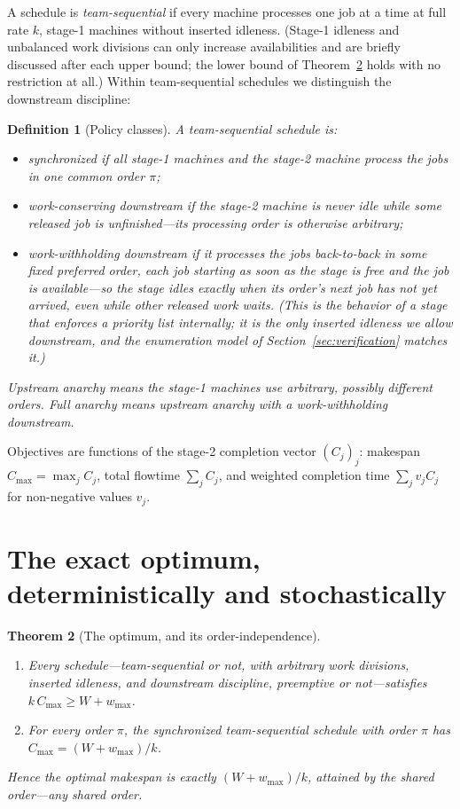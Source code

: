 \documentclass[sn-mathphys,NameDate]{sn-jnl}
\theoremstyle{thmstyleone}
\newtheorem{theorem}{Theorem}
\theoremstyle{thmstylethree}
\newtheorem{definition}[theorem]{Definition}
\theoremstyle{thmstyletwo}
\begin{document}
A schedule is \emph{team-sequential} if every machine processes one
job at a time at full rate $k$, stage-1 machines without inserted
idleness. (Stage-1 idleness and unbalanced work divisions can only
increase availabilities and are briefly discussed after each upper
bound; the lower bound of Theorem~\ref{thm:optimum} holds with no
restriction at all.) Within team-sequential schedules we distinguish
the downstream discipline:

\begin{definition}[Policy classes]\label{def:classes}
A team-sequential schedule is:
\begin{itemize}
\item \emph{synchronized} if all stage-1 machines and the stage-2
machine process the jobs in one common order $\pi$;
\item \emph{work-conserving downstream} if the stage-2 machine is
never idle while some released job is unfinished---its processing
order is otherwise arbitrary;
\item \emph{work-withholding downstream} if it processes the jobs
back-to-back in some fixed preferred order, each job starting as
soon as the stage is free \emph{and} the job is available---so the
stage idles exactly when its order's next job has not yet arrived,
even while other released work waits. (This is the behavior of a
stage that enforces a priority list internally; it is the only
inserted idleness we allow downstream, and the enumeration model of
Section~\ref{sec:verification} matches it.)
\end{itemize}
\emph{Upstream anarchy} means the stage-1 machines use arbitrary,
possibly different orders. \emph{Full anarchy} means upstream
anarchy with a work-withholding downstream.
\end{definition}

Objectives are functions of the stage-2 completion vector
$(C_j)_{j}$: makespan $C_{\max} = \max_j C_j$, total flowtime
$\sum_j C_j$, and weighted completion time $\sum_j v_j C_j$ for
non-negative values $v_j$.

\section{The exact optimum, deterministically and stochastically}
\label{sec:opt}

\begin{theorem}[The optimum, and its order-independence]
\label{thm:optimum}
\mbox{}
\begin{enumerate}
\item[(a)] Every schedule---team-sequential or not, with arbitrary
work divisions, inserted idleness, and downstream discipline,
preemptive or not---satisfies
$k\,C_{\max} \ge W + w_{\max}$.
\item[(b)] For every order $\pi$, the synchronized team-sequential
schedule with order $\pi$ has
$C_{\max} = (W + w_{\max})/k$.
\end{enumerate}
Hence the optimal makespan is exactly $(W+w_{\max})/k$, attained by
the shared order---\emph{any} shared order.
\end{theorem}
\end{document}
